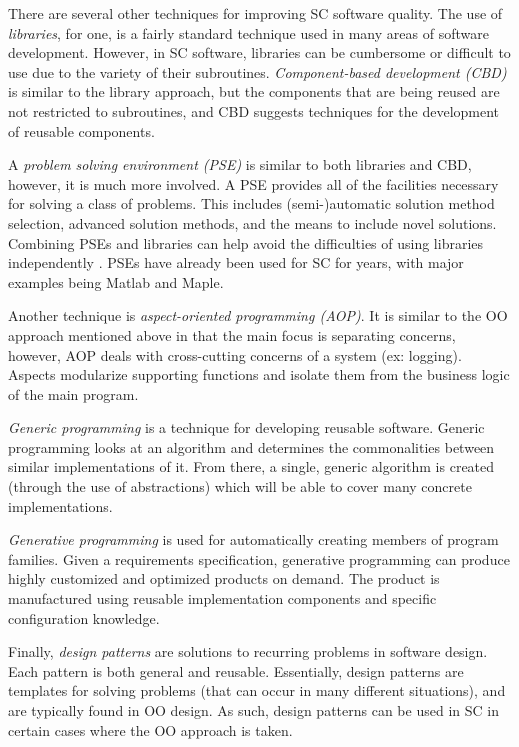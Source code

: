 \documentclass[10pt, preprint]{sigplanconf}
\begin{document}
There are several other techniques for improving SC software quality. The use of
\textit{libraries}, for one, is a fairly standard technique used in many areas
of software development. However, in SC software, libraries can be cumbersome or
difficult to use due to the variety of their
subroutines. \textit{Component-based development (CBD)} is similar to the
library approach, but the components that are being reused are not restricted to
subroutines, and CBD suggests techniques for the development of reusable
components.

A \textit{problem solving environment (PSE)} is similar to both libraries and
CBD, however, it is much more involved. A PSE provides all of the facilities
necessary for solving a class of problems. This includes (semi-)automatic
solution method selection, advanced solution methods, and the means to include
novel solutions. Combining PSEs and libraries can help avoid the difficulties of
using libraries independently \cite{RiceBoisvert1996}. PSEs have already been
used for SC for years, with major examples being Matlab and Maple.

Another technique is \textit{aspect-oriented programming (AOP)}. It is similar
to the OO approach mentioned above in that the main focus is separating
concerns, however, AOP deals with cross-cutting concerns of a system (ex:
logging). Aspects modularize supporting functions and isolate them from the
business logic of the main program.

\textit{Generic programming} is a technique for developing reusable
software. Generic programming looks at an algorithm and determines the
commonalities between similar implementations of it. From there, a single,
generic algorithm is created (through the use of abstractions) which will be
able to cover many concrete implementations.

\textit{Generative programming} is used for automatically creating members of
program families. Given a requirements specification, generative programming can
produce highly customized and optimized products on demand. The product is
manufactured using reusable implementation components and specific configuration
knowledge.

Finally, \textit{design patterns} are solutions to recurring problems in
software design. Each pattern is both general and reusable. Essentially, design
patterns are templates for solving problems (that can occur in many different
situations), and are typically found in OO design. As such, design patterns can
be used in SC in certain cases where the OO approach is taken.
\end{document}

